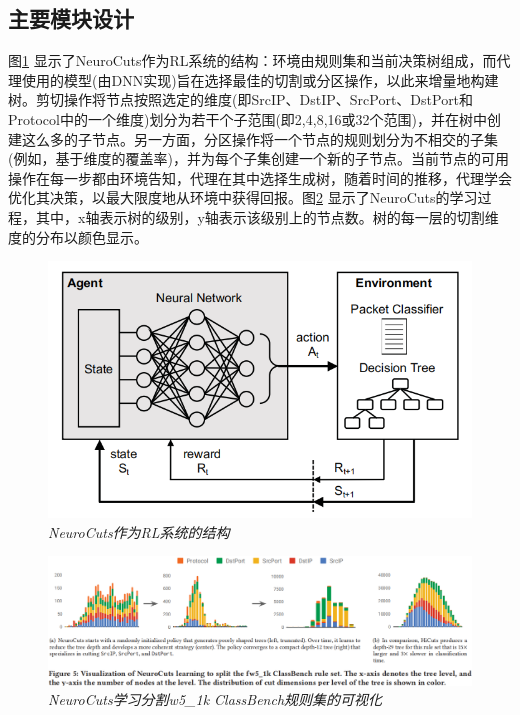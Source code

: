 \documentclass[UTF8,a4paper]{ctexart}
\begin{document}
\subsection{主要模块设计}
图\ref{fig:001} 显示了NeuroCuts作为RL系统的结构：环境由规则集和当前决策树组成，而代理使用的模型(由DNN实现)旨在选择最佳的切割或分区操作，以此来增量地构建树。剪切操作将节点按照选定的维度(即SrcIP、DstIP、SrcPort、DstPort和Protocol中的一个维度)划分为若干个子范围(即2,4,8,16或32个范围)，并在树中创建这么多的子节点。另一方面，分区操作将一个节点的规则划分为不相交的子集(例如，基于维度的覆盖率)，并为每个子集创建一个新的子节点。当前节点的可用操作在每一步都由环境告知，代理在其中选择生成树，随着时间的推移，代理学会优化其决策，以最大限度地从环境中获得回报。图\ref{fig:002} 显示了NeuroCuts的学习过程，其中，x轴表示树的级别，y轴表示该级别上的节点数。树的每一层的切割维度的分布以颜色显示。
	

\begin{figure}[H]
    \centering
    \includegraphics[width = \textwidth]{image001.png}
    \caption{\em NeuroCuts作为RL系统的结构}
    \label{fig:001}
\end{figure}
\begin{figure}[H]
    \centering
    \includegraphics[width = \textwidth]{image003.png}
    \caption{\em NeuroCuts学习分割w5\_1k ClassBench规则集的可视化}
    \label{fig:002}
\end{figure}
\end{document}
